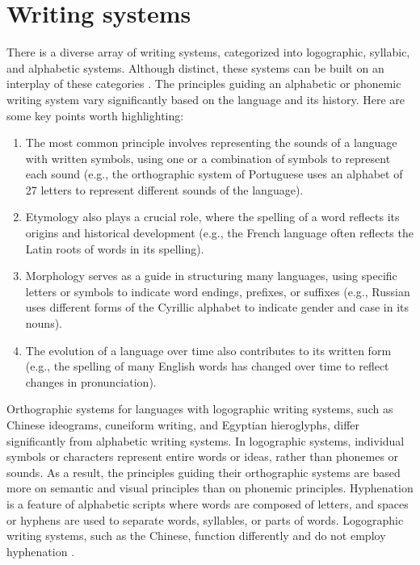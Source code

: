 \documentclass{article}
\begin{document}
\section{Writing systems}\label{sec-writing-systems}

There is a diverse array of writing systems, categorized into logographic,
syllabic, and alphabetic systems. Although distinct, these systems can be built
on an interplay of these categories \parencite{coulmas2003,palmer2010}. 
The principles guiding an alphabetic or phonemic writing system vary significantly 
based on the language and its history. Here are some key points worth highlighting:
\begin{enumerate}[label=\arabic*)]
    \item The most common principle involves representing the sounds of a
	language with written symbols, using one or a combination of symbols to
	represent each sound (e.g., the orthographic system of Portuguese uses
	an alphabet of 27 letters to represent different sounds of the
	language).
    \item Etymology also plays a crucial role, where the spelling of a word
	reflects its origins and historical development (e.g., the French
	language often reflects the Latin roots of words in its spelling).
    \item Morphology serves as a guide in structuring many languages, using
	specific letters or symbols to indicate word endings, prefixes, or
	suffixes (e.g., Russian uses different forms of the Cyrillic alphabet
	to indicate gender and case in its nouns).
    \item The evolution of a language over time also contributes to its written
	form (e.g., the spelling of many English words has changed over time to
	reflect changes in pronunciation).
\end{enumerate}
Orthographic systems for languages with logographic writing systems, such as
Chinese ideograms, cuneiform writing, and Egyptian hieroglyphs, differ
significantly from alphabetic writing systems. In logographic systems,
individual symbols or characters represent entire words or ideas, rather than
phonemes or sounds. As a result, the principles guiding their orthographic
systems are based more on semantic and visual principles than on phonemic
principles.
Hyphenation is a feature of alphabetic scripts where words are composed of letters, 
and spaces or hyphens are used to separate words, syllables, or parts of words. 
Logographic writing systems, such as the Chinese, 
function differently and do not employ hyphenation \parencite{honorof2006}.
\end{document}
